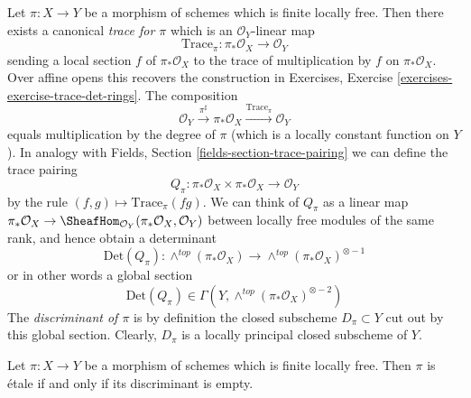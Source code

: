 \medskip\noindent
Let $\pi : X \to Y$ be a morphism of schemes which is finite locally
free. Then there exists a canonical {\it trace for $\pi$}
which is an $\mathcal{O}_Y$-linear map
$$
\text{Trace}_\pi : \pi_*\mathcal{O}_X \longrightarrow \mathcal{O}_Y
$$
sending a local section $f$ of $\pi_*\mathcal{O}_X$ to the
trace of multiplication by $f$ on $\pi_*\mathcal{O}_X$. Over
affine opens this recovers the construction in
Exercises, Exercise \ref{exercises-exercise-trace-det-rings}.
The composition
$$
\mathcal{O}_Y \xrightarrow{\pi^\sharp} \pi_*\mathcal{O}_X
\xrightarrow{\text{Trace}_\pi} \mathcal{O}_Y
$$
equals multiplication by the degree of $\pi$ (which is a locally constant
function on $Y$). In analogy with
Fields, Section \ref{fields-section-trace-pairing}
we can define the trace pairing
$$
Q_\pi :
\pi_*\mathcal{O}_X \times \pi_*\mathcal{O}_X
\longrightarrow
\mathcal{O}_Y
$$
by the rule $(f, g) \mapsto \text{Trace}_\pi(fg)$. We can think of
$Q_\pi$ as a linear map
$\pi_*\mathcal{O}_X \to
\SheafHom_{\mathcal{O}_Y}(\pi_*\mathcal{O}_X, \mathcal{O}_Y)$
between locally free modules of the same rank, and hence obtain
a determinant
$$
\text{Det}(Q_\pi) :
\wedge^{top}(\pi_*\mathcal{O}_X)
\longrightarrow
\wedge^{top}(\pi_*\mathcal{O}_X)^{\otimes -1}
$$
or in other words a global section
$$
\text{Det}(Q_\pi) \in \Gamma(Y, \wedge^{top}(\pi_*\mathcal{O}_X)^{\otimes -2})
$$
The {\it discriminant of $\pi$} is by definition the closed
subscheme $D_\pi \subset Y$ cut out by this global section.
Clearly, $D_\pi$ is a locally principal closed subscheme of $Y$.

\begin{lemma}
\label{lemma-discriminant}
Let $\pi : X \to Y$ be a morphism of schemes which is finite locally
free. Then $\pi$ is \'etale if and only if its discriminant is empty.
\end{lemma}

